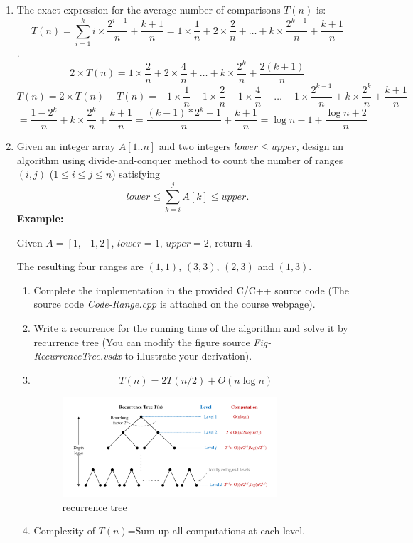 \documentclass[12pt,a4paper]{article}
\makeatletter
\newtheorem*{solution}{Solution}
\theoremstyle{definition}
\renewenvironment{solution}[1][Solution] {\par\pushQED{\qed}\normalfont\topsep6\p@\@plus6\p@\relax\trivlist\item[\hskip\labelsep\bfseries#1\@addpunct{.}]\ignorespaces}{\popQED\endtrivlist\@endpefalse} \makeatother
\makeatother
\begin{document}
\begin{enumerate}
\begin{solution}
The exact expression for the average number of comparisons $T(n)$ is:
$$T(n)=\sum\limits_{i=1}^{k}{i\times\frac{2^{i-1}}{n}}+\frac{k+1}{n}=1\times\frac{1}{n}+2\times\frac{2}{n}+\dots+k\times\frac{2^{k-1}}{n}+\frac{k+1}{n}$$.
$$2\times T(n)=1\times\frac{2}{n}+2\times\frac{4}{n}+\dots+k\times\frac{2^{k}}{n}+\frac{2(k+1)}{n}$$
$$T(n)=2\times T(n)-T(n)=-1\times\frac{1}{n}-1\times\frac{2}{n}-1\times\frac{4}{n}-\dots-1\times\frac{2^{k-1}}{n}+k\times\frac{2^k}{n}+\frac{k+1}{n}$$
$$=\frac{1-2^k}{n}+k\times\frac{2^k}{n}+\frac{k+1}{n}=\frac{(k-1)*2^k+1}{n}+\frac{k+1}{n}=\log n-1+\frac{\log n+2}{n}$$
\end{solution}

\item Given an integer array $A[1..n]$ and two integers $lower \le upper$, design an algorithm using divide-and-conquer method to count the number of ranges $(i,j)$ ($1 \leq i \leq j \leq n$) satisfying
$$
    lower \leq \sum_{k=i}^{j}{A[k]} \leq upper.
$$
\textbf{Example:}

Given $A = [1,-1,2]$, $lower = 1$, $upper = 2$, return 4.

The resulting four ranges are $(1,1)$, $(3,3)$, $(2,3)$ and $(1,3)$.

\begin{enumerate}
\item
Complete the implementation in the provided C/C++ source code {\color{blue}(The source code \emph{Code-Range.cpp} is attached on the course webpage)}.
\item
Write a recurrence for the running time of the algorithm and solve it by recurrence tree {\color{blue}(You can modify the figure source
\emph{Fig-RecurrenceTree.vsdx} to illustrate your derivation)}.
\begin{solution}
$$T(n)=2T(n/2)+O(n\log n)$$
\begin{figure}[htbp]
    \centering
    \includegraphics[width=0.8\textwidth]{Fig-RecurrenceTree.pdf}
    \caption{recurrence tree}\label{Fig-RecurrenceTree}
\end{figure}
\item
Complexity of $T(n)$=Sum up all computations at each level.


\end{solution}
\end{enumerate}
\end{enumerate}
\end{document}
